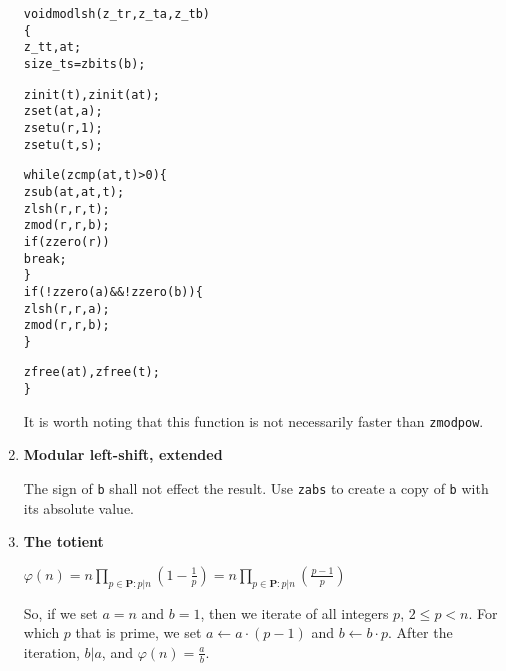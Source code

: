 \begin{enumerate}[label=\textbf{\arabic*}.]
\vspace{-1em}
\begin{alltt}
void modlsh(z_t r, z_t a, z_t b)
\{
    z_t t, at;
    size_t s = zbits(b);

    zinit(t), zinit(at);
    zset(at, a);
    zsetu(r, 1);
    zsetu(t, s);

    while (zcmp(at, t) > 0) \{
        zsub(at, at, t);
        zlsh(r, r, t);
        zmod(r, r, b);
        if (zzero(r))
            break;
    \}
    if (!zzero(a) && !zzero(b)) \{
        zlsh(r, r, a);
        zmod(r, r, b);
    \}

    zfree(at), zfree(t);
\}
\end{alltt}
\vspace{-1em}

It is worth noting that this function is
not necessarily faster than \texttt{zmodpow}.



\item \textbf{Modular left-shift, extended}

The sign of \texttt{b} shall not effect the
result. Use \texttt{zabs} to create a copy
of \texttt{b} with its absolute value.



\item \textbf{The totient}

\( \displaystyle{
    \varphi(n)
    = n \prod_{p \in \textbf{P} : p | n} \left ( 1 - \frac{1}{p} \right )
    = n \prod_{p \in \textbf{P} : p | n} \left ( \frac{p - 1}{p} \right )
}\)

\noindent
So, if we set $a = n$ and $b = 1$, then we iterate
of all integers $p$, $2 \le p < n$. For which $p$
that is prime, we set $a \gets a \cdot (p - 1)$ and
$b \gets b \cdot p$. After the iteration, $b | a$,
and $\varphi(n) = \frac{a}{b}$.




\end{enumerate}
